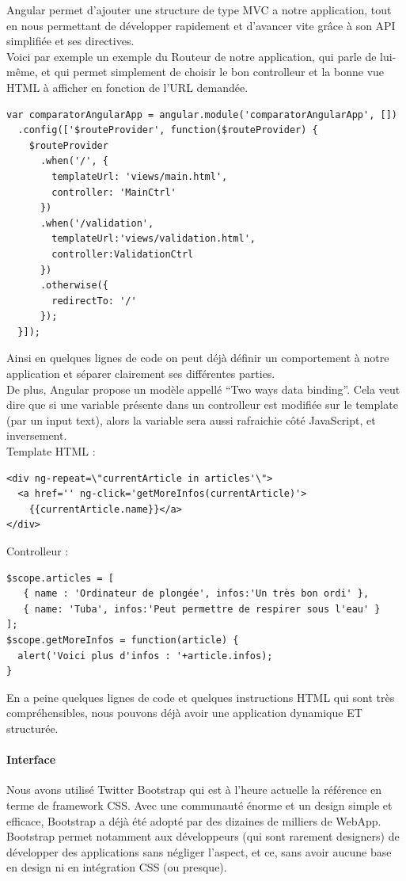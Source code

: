 \documentclass{report}
\begin{document}
Angular permet d'ajouter une structure de type MVC a notre application, tout en nous permettant de développer rapidement et d'avancer vite grâce à son API simplifiée et ses directives.\\

Voici par exemple un exemple du Routeur de notre application, qui parle de lui-même, et qui permet simplement de choisir le bon controlleur et la bonne vue HTML à afficher en fonction de l'URL demandée.

\begin{lstlisting}
var comparatorAngularApp = angular.module('comparatorAngularApp', [])
  .config(['$routeProvider', function($routeProvider) {
    $routeProvider
      .when('/', {
        templateUrl: 'views/main.html',
        controller: 'MainCtrl'
      })
      .when('/validation',
        templateUrl:'views/validation.html',
        controller:ValidationCtrl
      })
      .otherwise({
        redirectTo: '/'
      });
  }]);
\end{lstlisting}

Ainsi en quelques lignes de code on peut déjà définir un comportement à notre application et séparer clairement ses différentes parties.\\

De plus, Angular propose un modèle appellé “Two ways data binding”. Cela veut dire que si une variable présente dans un controlleur est modifiée sur le template (par un input text), alors la variable sera aussi rafraichie côté JavaScript, et inversement.\\

Template HTML :
\begin{lstlisting}
<div ng-repeat=\"currentArticle in articles'\">
  <a href='' ng-click='getMoreInfos(currentArticle)'>
  	{{currentArticle.name}}</a>
</div>
\end{lstlisting}
\newpage
Controlleur :
\begin{lstlisting}
$scope.articles = [
   { name : 'Ordinateur de plongée', infos:'Un très bon ordi' },
   { name: 'Tuba', infos:'Peut permettre de respirer sous l'eau' }
];
$scope.getMoreInfos = function(article) {
  alert('Voici plus d'infos : '+article.infos);
}
\end{lstlisting}

En a peine quelques lignes de code et quelques instructions HTML qui sont très compréhensibles, nous pouvons déjà avoir une application dynamique ET structurée. 

\paragraph*{Interface}
Nous avons utilisé Twitter Bootstrap qui est à l'heure actuelle la référence en terme de framework CSS. Avec une communauté énorme et un design simple et efficace, Bootstrap a déjà été adopté par des dizaines de milliers de WebApp. Bootstrap permet notamment aux développeurs (qui sont rarement designers) de développer des applications sans négliger l'aspect, et ce, sans avoir aucune base en design ni en intégration CSS (ou presque).
\end{document}
